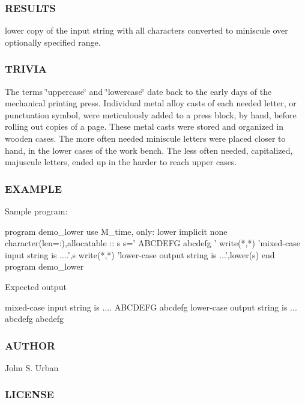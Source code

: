 \subsubsection*{R\+E\+S\+U\+L\+TS}

lower copy of the input string with all characters converted to miniscule over optionally specified range.

\subsubsection*{T\+R\+I\+V\+IA}

The terms \char`\"{}uppercase\char`\"{} and \char`\"{}lowercase\char`\"{} date back to the early days of the mechanical printing press. Individual metal alloy casts of each needed letter, or punctuation symbol, were meticulously added to a press block, by hand, before rolling out copies of a page. These metal casts were stored and organized in wooden cases. The more often needed miniscule letters were placed closer to hand, in the lower cases of the work bench. The less often needed, capitalized, majuscule letters, ended up in the harder to reach upper cases.

\subsubsection*{E\+X\+A\+M\+P\+LE}

\begin{DoxyVerb}Sample program:

 program demo_lower
 use M_time, only: lower
 implicit none
 character(len=:),allocatable  :: s
    s=' ABCDEFG abcdefg '
    write(*,*) 'mixed-case input string is ....',s
    write(*,*) 'lower-case output string is ...',lower(s)
 end program demo_lower

Expected output

   mixed-case input string is .... ABCDEFG abcdefg
   lower-case output string is ... abcdefg abcdefg
\end{DoxyVerb}
 \subsubsection*{A\+U\+T\+H\+OR}

John S. Urban \subsubsection*{L\+I\+C\+E\+N\+SE}

